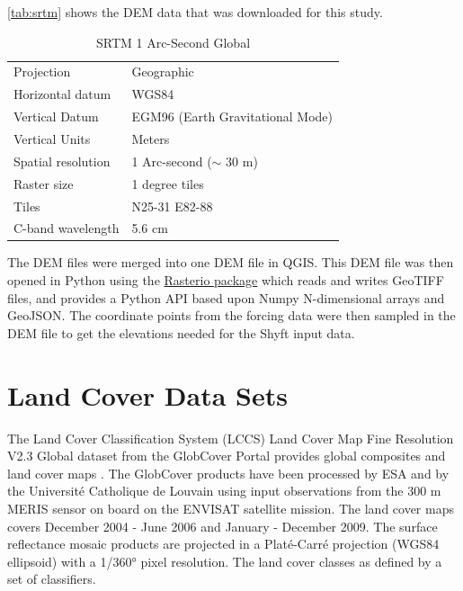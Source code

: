 \autoref{tab:srtm} shows the DEM data that was downloaded for this study.

\begin{table}[ht]
\centering
\caption{SRTM 1 Arc-Second Global}
\label{tab:srtm}
\begin{tabular}{ll}
\toprule
Projection                        & Geographic                       \\
Horizontal datum                  & WGS84                            \\
Vertical Datum                    & EGM96 (Earth Gravitational Mode) \\
Vertical Units                    & Meters                           \\
Spatial resolution                & 1 Arc-second ($\sim$ 30 m)       \\
Raster size                       & 1 degree tiles                   \\
Tiles                             & N25-31 E82-88                    \\
C-band wavelength                 & 5.6 cm                           \\ 
\bottomrule
\end{tabular}
\end{table}

The DEM files were merged into one DEM file in QGIS. This DEM file was then opened in Python using the  \href{https://rasterio.readthedocs.io/en/latest/index.html}{Rasterio package} which reads and writes GeoTIFF files, and provides a Python API based upon Numpy N-dimensional arrays and GeoJSON. The coordinate points from the forcing data were then sampled in the DEM file to get the elevations needed for the Shyft input data.

\section{Land Cover Data Sets}

The Land Cover Classification System (LCCS) Land Cover Map Fine Resolution V2.3 Global dataset from the GlobCover Portal provides global composites and land cover maps \autocite{bontempsGLOBCOVER2009Products2011}. The GlobCover products have been processed by ESA and by the Université Catholique de Louvain using input observations from the 300 m MERIS sensor on board on the ENVISAT satellite mission. The land cover maps covers December 2004 - June 2006 and January - December 2009. The surface reflectance mosaic products are projected in a Platé-Carré projection (WGS84 ellipsoid) with a 1/360° pixel resolution. The land cover classes as defined by a set of classifiers. 


